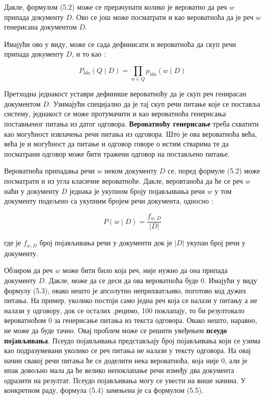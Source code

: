 Дакле, формулом (5.2) може се прерачунати колико је вероватно да реч $w$ припада документу $D$. Ово се још може посматрати и као вероватноћа да је реч $w$ генерисана документом $D$.

Имајући ово у виду, може се сада дефинисати и вероватноћа да скуп речи припада документу  $D$, и то као :

\begin{equation}
P_{lda}(Q \mid D) = \prod_{w \in Q} p_{lda}(w \mid D) 
\end{equation}

Претходна једнакост уставри дефинише вероватноћу да је скуп реч генирасан документом $D$. Узимајући специјално да је тај скуп речи питање које се поставља систему, једнакост се може протумачити и као вероватноћа генерисања поставњеног питања из датог одговора. \textbf{Вероватноћу генерисање} треба схватити као могућност извлачења речи питања из одговора.  Што је ова вероватноћа већа, већа је и могућност да питање и одговор говоре о истим стварима те да посматрани одговор може бити тражени одговор на постављено питање.

Вероватноћа припадања речи $w$ неком     документу $D$ се, поред формуле (5.2) може посматрати и из угла класичне вероватноће. Дакле, веровтаноћа да ће се реч $w$ наћи у      документу $D$ једнака је укупном броју појављивања речи $w$ у том документу подељено са укупним бројем речи документа, односно :

\begin{equation}
P(w \mid D) = \frac{f_{w,D}}{|D|}
\end{equation}

где је $f_{w,D}$ број појављивања речи у документи док је $|D|$ укупан број речи у документу.

Обзиром да реч $w$ може бити било која реч, није нужно да она припада документу $D$. Дакле, може да се деси да ова вероватноћа буде 0. Имајући у виду формулу (5.3), овако нешто је апсолутно неприхватљиво, поготово код дужих питања. На пример, уколико постоји само једна реч која се налази у питању а не налази у одговору, док се осталих  ,рецимо, 100 поклапају, то би резултовало вероватноћом  0 за генерисање питања из текста одговора. Овако нешто, наравно, не може да буде тачно.
Овај проблем може се решити увеђењем \textbf{псеудо појављивања}. 
Псеудо појављивања представљају број појављивања који се узима као подразумевани уколико се реч питања не налази у тексту одговора. На овај начин свакој речи питања ће се доделити нека вероватноћа, која није 0, али је ипак довољно мала да ће велико непоклапање речи између два документа одразити на резултат. Псеудо појављивања могу се увести на више начина. У конкретном раду, формула (5.4) замењена је са формулом (5.5).

